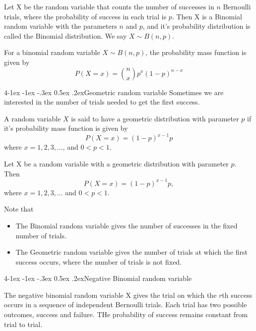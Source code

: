\documentclass{tufte-handout}
\makeatletter
\renewcommand{\paragraph}{\@startsection{paragraph}%
    {4}{\z@}{-1ex \@plus -1ex \@minus -.3ex}%
    {0.5ex \@plus .2ex}{\normalfont\normalsize\bfseries}}
\makeatother
\begin{document}
\begin{Definition}
    Let X be the random variable that counts the number of successes in \( n \) Bernoulli
    trials, where the probability of success in each trial is \( p \). Then X is a 
    Binomial random variable with the parameters \( n \) and \( p \), and it's probability distribution is called the Binomial distribution.
    We say \( X \sim B(n,p) \).
\end{Definition}

\begin{Theorem}
    For a binomial random variable \( X \sim B(n,p) \), the probability mass function is given by
    \[ P(X = x) = \binom{n}{x} p^x (1-p)^{n-x} \]
\end{Theorem}

\paragraph{Geometric random variable}
Sometimes we are interested in the number of trials needed to get the first success.
\begin{Definition}
    A random variable \( X \) is said to have a geometric distribution with parameter \( p \) if
    it's probability mass function is given by
    \[ P(X = x) = (1-p)^{x-1} p \]
    where \( x = 1,2,3,\ldots \), and \( 0 < p < 1 \).
\end{Definition}

\begin{Theorem}
    Let X be a random variable with a geometric distribution with parameter \( p \).
    Then
    \[P(X=x) = (1-p)^{x-1}p,\]
    where \( x = 1,2,3,\ldots \) and \( 0 < p < 1 \).
\end{Theorem}

Note that
\begin{itemize}
    \item The Binomial random variable gives the number of successes in the fixed number of trials.
    \item The Geometric random variable gives the number of trials at which the first success occurs,
    where the number of trials is not fixed.
\end{itemize}

\paragraph{Negative Binomial random variable}
\begin{Definition}
    The negative binomial random variable X gives the trial on which
    the \( r \)th success occurs in a sequence of independent Bernoulli trials.
    Each trial has two possible outcomes, success and failure. THe probability
    of success remains constant from trial to trial.
\end{Definition}
\end{document}
